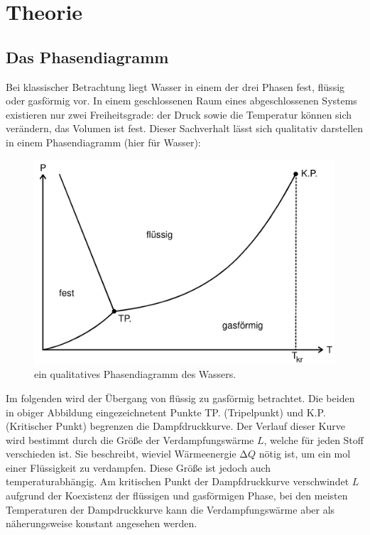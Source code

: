 \section{Theorie}
  \subsection{Das Phasendiagramm}
  Bei klassischer Betrachtung liegt Wasser in einem der drei Phasen fest, flüssig oder gasförmig vor. In einem geschlossenen Raum eines abgeschlossenen Systems existieren nur
  zwei Freiheitsgrade: der Druck sowie die Temperatur können sich verändern, das Volumen ist fest. Dieser Sachverhalt lässt sich qualitativ darstellen in einem Phasendiagramm
  (hier für Wasser):
  \begin{figure}
    \centering
      \includegraphics{phasendiagramm.png}
      \caption{ein qualitatives Phasendiagramm des Wassers.}
  \end{figure}
  Im folgenden wird der Übergang von flüssig zu gasförmig betrachtet. Die beiden in obiger Abbildung eingezeichnetent Punkte TP. (Tripelpunkt) und K.P. (Kritischer Punkt)
  begrenzen die Dampfdruckkurve. Der Verlauf dieser Kurve wird bestimmt durch die Größe der Verdampfungswärme $L$, welche für jeden Stoff verschieden ist. Sie beschreibt,
  wieviel Wärmeenergie $\increment Q$ nötig ist, um ein mol einer Flüssigkeit zu verdampfen. Diese Größe ist jedoch auch temperaturabhängig. Am kritischen Punkt der
  Dampfdruckkurve verschwindet $L$ aufgrund der Koexistenz der flüssigen und gasförmigen Phase, bei den meisten Temperaturen der Dampdruckkurve kann die Verdampfungswärme
  aber als näherungsweise konstant angesehen werden.
\label{sec:Theorie}
